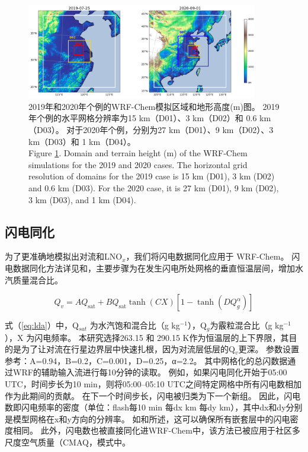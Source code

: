 \begin{figure}[!htbp]
\centering
\includegraphics[width=0.9\textwidth]{./figures/domains_china.png}
\caption{2019年和2020年个例的WRF-Chem模拟区域和地形高度(m)图。
2019年个例的水平网格分辨率为15 km（D01）、3 km（D02）和 0.6 km（D03）。
对于2020年个例，分别为27 km（D01）、9 km（D02）、3 km（D03）和 1 km（D04）。\\
Figure \ref{fig:domains_china}. Domain and terrain height (m) of the WRF-Chem simulations for the 2019 and 2020 cases. The horizontal grid resolution of
domains for the 2019 case is 15 km (D01), 3 km (D02) and 0.6 km (D03). For the 2020 case, it is 27 km (D01), 9 km (D02), 3 km (D03),
and 1 km (D04).}
\label{fig:domains_china}
\end{figure}

\subsection{闪电同化} \label{sect:lightning_assimilation}

为了更准确地模拟出对流和LNO$_x$，我们将闪电数据同化应用于 WRF-Chem。
闪电数据同化方法详见\citet{Fierro.2012}和\citet{Li.2017b}，主要步骤为在发生闪电所处网格的垂直恒温层间，增加水汽质量混合比。

\begin{equation} \label{eq:lda}
Q_{v}=A Q_{\mathrm{sat}}+B Q_{\mathrm{sat}} \tanh (C X)\left[1-\tanh \left(D Q_{g}^{\alpha}\right)\right]
\end{equation}

式（\ref{eq:lda}）中，Q$_{sat}$ 为水汽饱和混合比（g kg$^{−1}$），Q$_g$为霰粒混合比（g kg$^{−1}$），X 为闪电频率。
本研究选择263.15 和 290.15 K作为恒温层的上下界限，其目的是为了让对流在行星边界层中快速扎根，因为对流层低层的Q$_v$更深\citep{Marchand.2014,Finney.2016,Li.2017b}。
参数设置参考\citet{Li.2017b}：A=0.94，B=0.2，C=0.001，D=0.25，α=2.2。
其中网格化的总闪数据通过WRF的辅助输入流进行每10分钟的读取。
例如，如果闪电同化开始于05:00 UTC，时间步长为10 min，则将05:00--05:10 UTC之间特定网格中所有闪电数相加作为此期间的贡献。
在下一个时间步长，闪电被归类为下一个新组。
因此，闪电数即闪电频率的密度（单位：flash每10 min 每dx km 每dy km），其中dx和dy分别是模型网格在x和y方向的分辨率。
如\citet{Fierro.2012}和\citet{Li.2017b}所述，这可以确保所有嵌套层中的闪电密度相同。
此外，闪电数也被直接同化进WRF-Chem中，该方法已被应用于社区多尺度空气质量（CMAQ，\citet{Kang.2019,Kang.2019a,Kang.2020}模式中。

